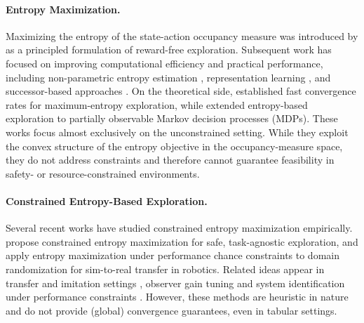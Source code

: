 \documentclass{article}
\theoremstyle{plain}
\theoremstyle{definition}
\theoremstyle{remark}
\begin{document}
\paragraph{Entropy Maximization.}
Maximizing the entropy of the state-action occupancy measure was introduced
by \citet{hazanProvablyEfficientMaximum2019} as a principled formulation of
reward-free exploration. Subsequent work has focused on improving
computational efficiency and practical performance, including
non-parametric entropy estimation
\cite{muttiIntrinsicallyMotivatedApproachLearning2020,
 muttiTaskAgnosticExplorationPolicy2021}, representation learning
\cite{seoStateEntropyMaximization2021,yaratsReinforcementLearningPrototypical2021},
and successor-based approaches \cite{liuAPSActivePretraining2021,
 liuBehaviorVoidUnsupervised2021}. On the theoretical side,
\citet{tiapkinFastRatesMaximum2023} established fast convergence rates for
maximum-entropy exploration, while \citet{zamboniHowExploreBelief2024,
 zamboniLimitsPureExploration2024} extended entropy-based exploration to
partially observable Markov decision processes (MDPs). These works focus
almost exclusively on the unconstrained setting. While they exploit the
convex structure of the entropy objective in the occupancy-measure space,
they do not address constraints and therefore cannot guarantee feasibility
in safety- or resource-constrained environments.

\paragraph{Constrained Entropy-Based Exploration.}
Several recent works have studied constrained entropy maximization
empirically. \citet{yangCEMConstrainedEntropy2023} propose constrained
entropy maximization for safe, task-agnostic exploration, and
\citet{tiboniDomainRandomizationEntropy2024} apply entropy maximization
under performance chance constraints to domain randomization for
sim-to-real transfer in robotics. Related ideas appear in transfer and
imitation settings \cite{blessingInformationMaximizingCurriculum2023a,
 yangReinforcementLearningGuided2023,
 kimAcceleratingReinforcementLearning2023}, observer gain tuning
\cite{klinkTrackingControlSpherical2023b, lutterInductiveBiasesMachine2021}
and system identification under performance constraints
\cite{wolfInterpretableEfficientDatadriven2025,
 zolmanSINDyRLInterpretableEfficient2025}. However, these methods are
heuristic in nature and do not provide (global) convergence guarantees,
even in tabular settings.
\end{document}

